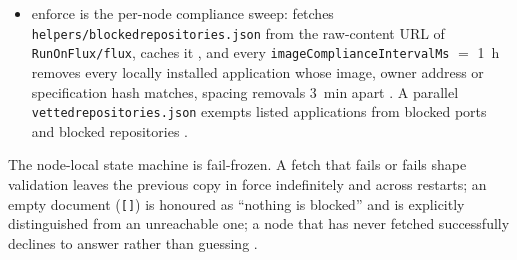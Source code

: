 \begin{definition}
\begin{itemize}
  \item $\mathrm{enforce}$ is the per-node compliance sweep: \FluxOS{} fetches
    \texttt{helpers/\allowbreak{}blockedrepositories.\allowbreak{}json} from the raw-content URL of \texttt{RunOnFlux/flux},
    caches it , and every
    \texttt{image\allowbreak{}Compliance\allowbreak{}Interval\allowbreak{}Ms} $=$ \SI{1}{\hour}
     removes every locally installed
    application whose image, owner address or specification hash matches, spacing removals
    \SI{3}{\minute} apart
    . A parallel
    \texttt{vettedrepositories.\allowbreak{}json} exempts listed applications from blocked ports and blocked
    repositories .
\end{itemize}
The node-local state machine is fail-frozen. A fetch that fails or fails shape validation leaves
the previous copy in force indefinitely and across restarts; an empty document (\texttt{[]}) is
honoured as ``nothing is blocked'' and is explicitly distinguished from an unreachable one; a node
that has never fetched successfully declines to answer rather than guessing
.
\end{definition}

